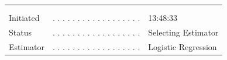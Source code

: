 \documentclass[
  letterpaper,
  DIV=11,
  numbers=noendperiod]{scrartcl}
\begin{document}
\begin{table}

\begin{minipage}[t]{\linewidth}

{\centering 

}

\end{minipage}%
\newline
\begin{minipage}[t]{\linewidth}

{\centering 

\begin{longtable}[]{@{}lll@{}}
\toprule\noalign{}
& & \\
& & \\
\midrule\noalign{}
\endhead
\bottomrule\noalign{}
\endlastfoot
Initiated & . . . . . . . . . . . . . . . . . . & 13:48:33 \\
Status & . . . . . . . . . . . . . . . . . . & Selecting Estimator \\
Estimator & . . . . . . . . . . . . . . . . . . & Logistic Regression \\
\end{longtable}

}

\end{minipage}%
\newline
\begin{minipage}[t]{\linewidth}

{\centering 

}

\end{minipage}%
\newline
\begin{minipage}[t]{\linewidth}

{\centering 

}

\end{minipage}%
\newline
\begin{minipage}[t]{\linewidth}

{\centering 

}
\end{minipage}
\end{table}
\end{document}
